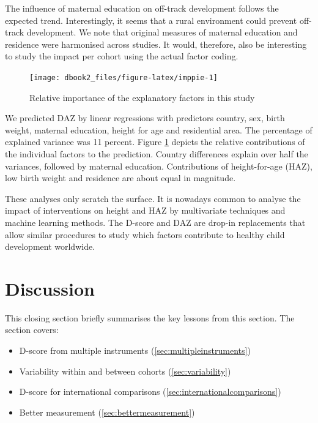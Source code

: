 \documentclass[
]{book}
\providecommand{\tightlist}{%
  \setlength{\itemsep}{0pt}\setlength{\parskip}{0pt}}
\begin{document}
The influence of maternal education on off-track development follows the expected trend. Interestingly, it seems that a rural environment could prevent off-track development. We note that original measures of maternal education and residence were harmonised across studies. It would, therefore, also be interesting to study the impact per cohort using the actual factor coding.

\begin{figure}

{\centering \texttt{[image: dbook2\_files/figure-latex/imppie-1]} 

}

\caption{Relative importance of the explanatory factors in this study}\label{fig:imppie}
\end{figure}



We predicted DAZ by linear regressions with predictors country, sex, birth weight, maternal education, height for age and residential area. The percentage of explained variance was 11 percent. Figure \ref{fig:imppie} depicts the relative contributions of the individual factors to the prediction. Country differences explain over half the variances, followed by maternal education. Contributions of height-for-age (HAZ), low birth weight and residence are about equal in magnitude.

These analyses only scratch the surface. It is nowadays common to analyse the impact of interventions on height and HAZ by multivariate techniques and machine learning methods. The D-score and DAZ are drop-in replacements that allow similar procedures to study which factors contribute to healthy child development worldwide.

\hypertarget{ch:discussion2}{%
\chapter{Discussion}\label{ch:discussion2}}

This closing section briefly summarises the key lessons from this section. The section covers:

\begin{itemize}
\tightlist
\item
  D-score from multiple instruments (\ref{sec:multipleinstruments})
\item
  Variability within and between cohorts (\ref{sec:variability})
\item
  D-score for international comparisons (\ref{sec:internationalcomparisons})
\item
  Better measurement (\ref{sec:bettermeasurement})
\end{itemize}
\end{document}
